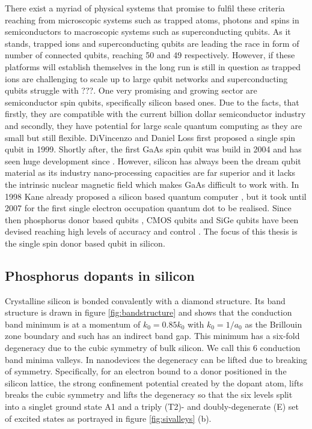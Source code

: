 There exist a myriad of physical systems that promise to fulfil these criteria  reaching from microscopic systems such as trapped atoms, photons and spins in semiconductors to macroscopic systems such as superconducting qubits. \cite{Ladd2010}
As it stands, trapped ions and superconducting qubits are leading the race in form of number of connected qubits, reaching 50 and 49 respectively\cite{50qubits, 49qubits}. However, if these platforms will establish themselves in the long run is still in question as trapped ions are challenging to scale up to large qubit networks and superconducting qubits struggle with ???\cite{idk}. One very promising and growing sector are semiconductor spin qubits, specifically silicon based ones. Due to the facts, that firstly, they are compatible with the current billion dollar semiconductor industry and secondly, they have potential for large scale quantum computing as they are small but still flexible. DiVincenzo and Daniel Loss first proposed a single spin qubit in 1999\cite{Loss1998}. Shortly after, the first GaAs spin qubit was build in 2004\cite{Elzerman2004} and has seen huge development since \cite{Koppens2006, Petta2005, ...}. However, silicon  has always been the dream qubit material as its industry nano-processing capacities are far superior and it lacks the intrinsic nuclear magnetic field which makes GaAs difficult to work with. In 1998 Kane already proposed a silicon based quantum computer \cite{Kane1998}, but it took until 2007 for the first single electron occupation quantum dot  \cite{Simmons2007} to be realised. Since then phosphorus donor based qubits \cite{Morello2010}, CMOS qubits \cite{Feldhorst} and SiGe qubits \cite{Tarucha} have been devised reaching high levels of accuracy and control \cite{??}. 
The focus of this thesis is the single spin donor based qubit in silicon.

\subsection{Phosphorus dopants in silicon} \label{sec:silicon}

Crystalline silicon is bonded convalently with a diamond structure. Its band structure is drawn in figure \ref{fig:bandstructure} and shows that the conduction band minimum is at a momentum of $k_0=0.85k_0$ with $k_0=1/a_0$ as the Brillouin zone boundary and such has an indirect band gap. This minimum has a six-fold degeneracy due to the cubic symmetry of bulk silicon. We call this 6 conduction band minima valleys. In nanodevices the degeneracy can be lifted due to breaking of symmetry. Specifically, for an electron bound to a donor positioned in the silicon lattice, the strong confinement potential created by the dopant atom, lifts breaks the cubic symmetry and lifts the degeneracy so that the six levels split into a singlet ground state A1 and a triply (T2)- and doubly-degenerate (E) set of excited states as portrayed in figure \ref{fig:sivalleys} (b). 

